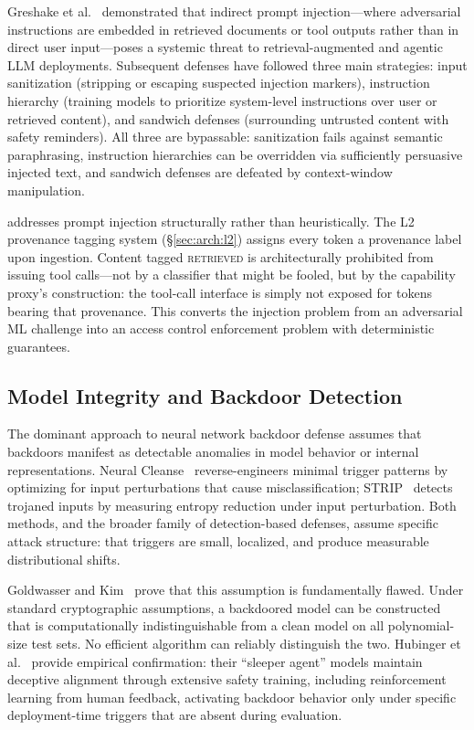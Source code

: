 Greshake et al.~\cite{greshake2023} demonstrated that indirect prompt injection---where adversarial instructions are embedded in retrieved documents or tool outputs rather than in direct user input---poses a systemic threat to retrieval-augmented and agentic LLM deployments. Subsequent defenses have followed three main strategies: input sanitization (stripping or escaping suspected injection markers), instruction hierarchy (training models to prioritize system-level instructions over user or retrieved content), and sandwich defenses (surrounding untrusted content with safety reminders). All three are bypassable: sanitization fails against semantic paraphrasing, instruction hierarchies can be overridden via sufficiently persuasive injected text, and sandwich defenses are defeated by context-window manipulation.

\sentinel addresses prompt injection structurally rather than heuristically. The L2 provenance tagging system (\S\ref{sec:arch:l2}) assigns every token a provenance label upon ingestion. Content tagged \textsc{retrieved} is architecturally prohibited from issuing tool calls---not by a classifier that might be fooled, but by the capability proxy's construction: the tool-call interface is simply not exposed for tokens bearing that provenance. This converts the injection problem from an adversarial ML challenge into an access control enforcement problem with deterministic guarantees.

\subsection{Model Integrity and Backdoor Detection}
\label{sec:related:integrity}

The dominant approach to neural network backdoor defense assumes that backdoors manifest as detectable anomalies in model behavior or internal representations. Neural Cleanse~\cite{wang2019} reverse-engineers minimal trigger patterns by optimizing for input perturbations that cause misclassification; STRIP~\cite{gao2021} detects trojaned inputs by measuring entropy reduction under input perturbation. Both methods, and the broader family of detection-based defenses, assume specific attack structure: that triggers are small, localized, and produce measurable distributional shifts.

Goldwasser and Kim~\cite{goldwasser2022} prove that this assumption is fundamentally flawed. Under standard cryptographic assumptions, a backdoored model can be constructed that is computationally indistinguishable from a clean model on all polynomial-size test sets. No efficient algorithm can reliably distinguish the two. Hubinger et al.~\cite{hubinger2024} provide empirical confirmation: their ``sleeper agent'' models maintain deceptive alignment through extensive safety training, including reinforcement learning from human feedback, activating backdoor behavior only under specific deployment-time triggers that are absent during evaluation.

